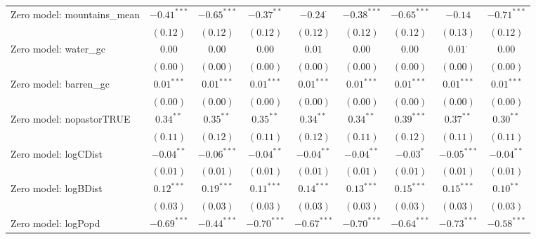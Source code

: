 \begin{sidewaystable}
\begin{center}
{\begin{tabular}{l c c c c c c c c}
Zero model: mountains\_mean    & $-0.41^{***}$ & $-0.65^{***}$ & $-0.37^{**}$  & $-0.24^{\cdot}$ & $-0.38^{***}$ & $-0.65^{***}$ & $-0.14$        & $-0.71^{***}$ \\
                               & $(0.12)$      & $(0.12)$      & $(0.12)$      & $(0.12)$        & $(0.12)$      & $(0.12)$      & $(0.13)$       & $(0.12)$      \\
Zero model: water\_gc          & $0.00$        & $0.00$        & $0.00$        & $0.01$          & $0.00$        & $0.00$        & $0.01^{\cdot}$ & $0.00$        \\
                               & $(0.00)$      & $(0.00)$      & $(0.00)$      & $(0.00)$        & $(0.00)$      & $(0.00)$      & $(0.00)$       & $(0.00)$      \\
Zero model: barren\_gc         & $0.01^{***}$  & $0.01^{***}$  & $0.01^{***}$  & $0.01^{***}$    & $0.01^{***}$  & $0.01^{***}$  & $0.01^{***}$   & $0.01^{***}$  \\
                               & $(0.00)$      & $(0.00)$      & $(0.00)$      & $(0.00)$        & $(0.00)$      & $(0.00)$      & $(0.00)$       & $(0.00)$      \\
Zero model: nopastorTRUE       & $0.34^{**}$   & $0.35^{**}$   & $0.35^{**}$   & $0.34^{**}$     & $0.34^{**}$   & $0.39^{***}$  & $0.37^{**}$    & $0.30^{**}$   \\
                               & $(0.11)$      & $(0.12)$      & $(0.11)$      & $(0.12)$        & $(0.11)$      & $(0.12)$      & $(0.11)$       & $(0.11)$      \\
Zero model: logCDist           & $-0.04^{**}$  & $-0.06^{***}$ & $-0.04^{**}$  & $-0.04^{**}$    & $-0.04^{**}$  & $-0.03^{*}$   & $-0.05^{***}$  & $-0.04^{**}$  \\
                               & $(0.01)$      & $(0.01)$      & $(0.01)$      & $(0.01)$        & $(0.01)$      & $(0.01)$      & $(0.01)$       & $(0.01)$      \\
Zero model: logBDist           & $0.12^{***}$  & $0.19^{***}$  & $0.11^{***}$  & $0.14^{***}$    & $0.13^{***}$  & $0.15^{***}$  & $0.15^{***}$   & $0.10^{**}$   \\
                               & $(0.03)$      & $(0.03)$      & $(0.03)$      & $(0.03)$        & $(0.03)$      & $(0.03)$      & $(0.03)$       & $(0.03)$      \\
Zero model: logPopd            & $-0.69^{***}$ & $-0.44^{***}$ & $-0.70^{***}$ & $-0.67^{***}$   & $-0.70^{***}$ & $-0.64^{***}$ & $-0.73^{***}$  & $-0.58^{***}$ \\

\end{tabular}}
\end{center}
\end{sidewaystable}
